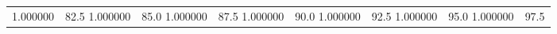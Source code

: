 \begin{table}
\begin{tabular}{llrrrrrr}
1.000000 & 82.5%
1.000000 & 85.0%
1.000000 & 87.5%
1.000000 & 90.0%
1.000000 & 92.5%
1.000000 & 95.0%
1.000000 & 97.5%
\end{tabular}
\end{table}
